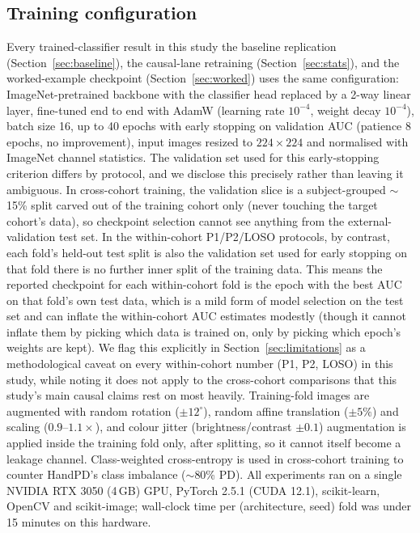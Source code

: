 \documentclass[3p,final,10pt]{elsarticle}
\let\oldsubsection\subsection
\renewcommand{\subsection}{\FloatBarrier\oldsubsection}
\begin{document}
\subsection{Training configuration}
\label{sec:training}
Every trained-classifier result in this study the baseline replication
(Section~\ref{sec:baseline}), the causal-lane retraining
(Section~\ref{sec:stats}), and the worked-example checkpoint
(Section~\ref{sec:worked}) uses the same configuration: ImageNet-pretrained
backbone with the classifier head replaced by a 2-way linear layer,
fine-tuned end to end with AdamW (learning rate $10^{-4}$, weight decay
$10^{-4}$), batch size 16, up to 40 epochs with early stopping on
validation AUC (patience 8 epochs, no improvement), input images resized
to $224\times224$ and normalised with ImageNet channel statistics. The
validation set used for this early-stopping criterion differs by
protocol, and we disclose this precisely rather than leaving it
ambiguous. In cross-cohort training, the validation slice is a
subject-grouped $\sim$15\% split carved out of the training cohort
only (never touching the target cohort's data), so checkpoint selection
cannot see anything from the external-validation test set. In the
within-cohort P1/P2/LOSO protocols, by contrast, each fold's held-out test
split is also the validation set used for early stopping on that fold
there is no further inner split of the training data. This means the
reported checkpoint for each within-cohort fold is the epoch with the best
AUC on that fold's own test data, which is a mild form of model
selection on the test set and can inflate the within-cohort AUC estimates
modestly (though it cannot inflate them by picking which data is trained
on, only by picking which epoch's weights are kept). We flag this
explicitly in Section~\ref{sec:limitations} as a methodological caveat on
every within-cohort number (P1, P2, LOSO) in this study, while noting it
does not apply to the cross-cohort comparisons that this study's main
causal claims rest on most heavily. Training-fold
images are augmented with random rotation ($\pm12^{\circ}$), random affine
translation ($\pm5\%$) and scaling ($0.9$--$1.1\times$), and colour jitter
(brightness/contrast $\pm0.1$) augmentation is applied inside the training
fold only, after splitting, so it cannot itself become a leakage channel.
Class-weighted cross-entropy is used in cross-cohort training to counter
HandPD's class imbalance ($\sim$80\% PD). All experiments ran on a single
NVIDIA RTX 3050 (4\,GB) GPU, PyTorch 2.5.1 (CUDA 12.1), scikit-learn,
OpenCV and scikit-image; wall-clock time per (architecture, seed) fold was
under 15 minutes on this hardware.
\end{document}
